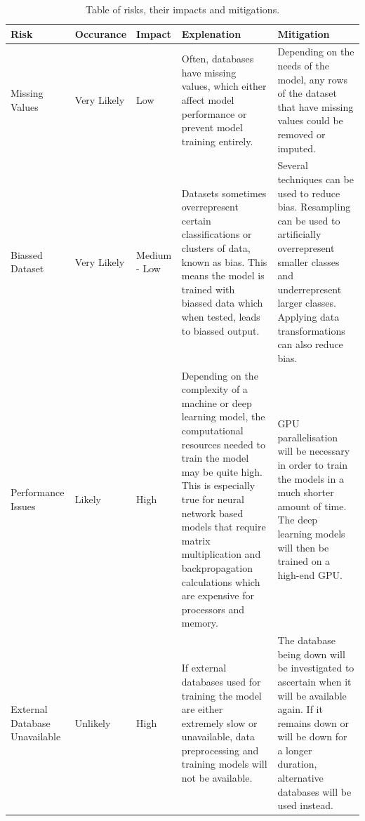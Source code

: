 \documentclass[12pt,runningheads]{llncs}
\begin{document}
\begin{table}
    \centering
    \caption{Table of risks, their impacts and mitigations.}\label{tab1}
    \begin{tabular}{|p{2cm}|p{2cm}|p{2cm}|p{4.5cm}|p{4.5cm}|}

        \hline
        Risk & Occurance & Impact & Explenation & Mitigation\\
        \hline
        Missing Values & Very Likely & Low & Often, databases have missing values, which either affect model performance or prevent model training entirely. & Depending on the needs of the model, any rows of the dataset that have missing values could be removed or imputed.\\
        \hline
        Biassed Dataset & Very Likely & Medium - Low & Datasets sometimes overrepresent certain classifications or clusters of data, known as bias. This means the model is trained with biassed data which when tested, leads to biassed output. & Several techniques can be used to reduce bias. Resampling can be used to artificially overrepresent smaller classes and underrepresent larger classes. Applying data transformations can also reduce bias.\\
        \hline
        Performance Issues & Likely & High & Depending on the complexity of a machine or deep learning model, the computational resources needed to train the model may be quite high. This is especially true for neural network based models that require matrix multiplication and backpropagation calculations which are expensive for processors and memory. & GPU parallelisation will be necessary in order to train the models in a much shorter amount of time. The deep learning models will then be trained on a high-end GPU.\\
        \hline
        External Database Unavailable & Unlikely & High & If external databases used for training the model are either extremely slow or unavailable, data preprocessing and training models will not be available. & The database being down will be investigated to ascertain when it will be available again. If it remains down or will be down for a longer duration, alternative databases will be used instead.\\
        \hline
    \end{tabular}
\end{table}

\newpage
\end{document}
